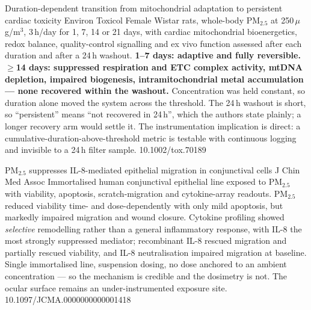 \documentclass[10pt]{article}
\begin{document}

{Duration-dependent transition from mitochondrial adaptation to persistent cardiac toxicity}
{Environ Toxicol}
{Female Wistar rats, whole-body PM$_{2.5}$ at 250\,$\mu$g/m$^3$, 3\,h/day for 1, 7, 14 or
21 days, with cardiac mitochondrial bioenergetics, redox balance, quality-control signalling
and ex vivo function assessed after each duration and after a 24\,h washout.
\textbf{1--7 days: adaptive and fully reversible. $\geq$14 days: suppressed respiration and
ETC complex activity, mtDNA depletion, impaired biogenesis, intramitochondrial metal
accumulation --- none recovered within the washout.} Concentration was held constant, so
duration alone moved the system across the threshold. The 24\,h washout is short, so
``persistent'' means ``not recovered in 24\,h'', which the authors state plainly; a longer
recovery arm would settle it. The instrumentation implication is direct: a
cumulative-duration-above-threshold metric is testable with continuous logging and invisible
to a 24\,h filter sample.}
{10.1002/tox.70189}

{PM$_{2.5}$ suppresses IL-8-mediated epithelial migration in conjunctival cells}
{J Chin Med Assoc}
{Immortalised human conjunctival epithelial line exposed to PM$_{2.5}$ with viability,
apoptosis, scratch-migration and cytokine-array readouts. PM$_{2.5}$ reduced viability
time- and dose-dependently with only mild apoptosis, but markedly impaired migration and
wound closure. Cytokine profiling showed \emph{selective} remodelling rather than a general
inflammatory response, with IL-8 the most strongly suppressed mediator; recombinant IL-8
rescued migration and partially rescued viability, and IL-8 neutralisation impaired migration
at baseline. Single immortalised line, suspension dosing, no dose anchored to an ambient
concentration --- so the mechanism is credible and the dosimetry is not. The ocular surface
remains an under-instrumented exposure site.}
{10.1097/JCMA.0000000000001418}

\end{document}

